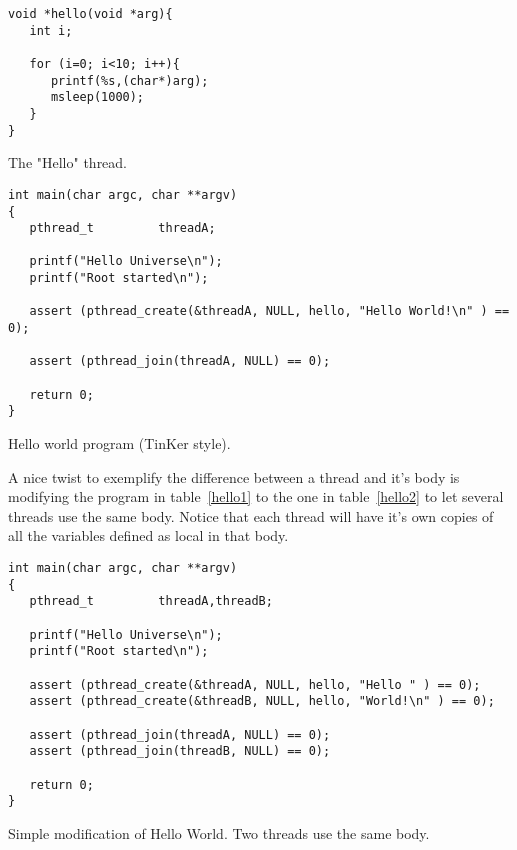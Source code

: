 \begin{table}[!hbp]
\begin{verbatim}
void *hello(void *arg){
   int i;

   for (i=0; i<10; i++){
      printf(%s,(char*)arg);
      msleep(1000);
   }
}
\end{verbatim}
\caption{The "Hello" thread.\label{hello_thread}}
\end{table}

\begin{table}[!hbp]
\begin{verbatim}
int main(char argc, char **argv)
{
   pthread_t         threadA;

   printf("Hello Universe\n");
   printf("Root started\n");

   assert (pthread_create(&threadA, NULL, hello, "Hello World!\n" ) == 0);

   assert (pthread_join(threadA, NULL) == 0);

   return 0;
}
\end{verbatim}
\caption{Hello world program (TinKer style).\label{hello1}}
\end{table}
A nice twist to exemplify the difference between a thread and it's body is modifying the program in table~\ref{hello1} to the one in table~\ref{hello2} to let several threads use the same body. Notice that each thread will have it's own copies of all the variables defined as local in that body.

\begin{table}[!hbp]
\begin{verbatim}
int main(char argc, char **argv)
{
   pthread_t         threadA,threadB;

   printf("Hello Universe\n");
   printf("Root started\n");

   assert (pthread_create(&threadA, NULL, hello, "Hello " ) == 0);
   assert (pthread_create(&threadB, NULL, hello, "World!\n" ) == 0);

   assert (pthread_join(threadA, NULL) == 0);
   assert (pthread_join(threadB, NULL) == 0);

   return 0;
}
\end{verbatim}
\caption{Simple modification of Hello World. Two threads use the same body.\label{hello2}}
\end{table}

